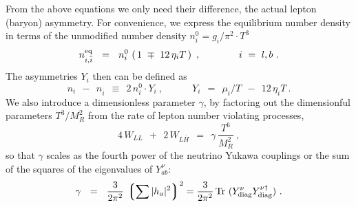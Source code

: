 \documentclass[12pt]{revtex4}
\newcommand{\eq}{{\rm eq}}
\newcommand{\lgr}{\left\lgroup}
\newcommand{\rgr}{\right\rgroup}
\newcommand{\Mpl}{M_{\rm Pl}}
\newcommand{\ov}{\overline}
\begin{document}
	From the above equations we only need their difference, the actual
	lepton (baryon) asymmetry.
	For convenience, we express the equilibrium number density in terms
	of the unmodified number density 
	$ n_i^0 = g_i/\pi^2 \cdot T^3 $
\[
	n_{i,\ov{i}}^\eq ~~=~~ n_i^0\, \left(\, 1 ~\mp~ 12\,\eta_i T \,\right)~,
	\qquad\qquad{i ~=~ l, b}~.
\]
	The asymmetries $ Y_i $ then can be defined as
\[
	n_i ~~-~~ n_{\ov{i}} ~~\equiv~~ 2\, n_i^0 \cdot Y_i~,
	\qquad\quad Y_i ~~=~~ \mu_i/T ~~-~~ 12\,\eta_i T~.
\]
	We also introduce a dimensionless parameter $ \gamma $, 
	by factoring out the dimensionful parameters $T^3/M_R^2$ from
	the rate of lepton number violating processes,
\begin{equation*}
	4\, W_{LL} ~~+~~ 2\, W_{L\ov{H}} ~~=~~ 
		 \gamma\, \frac{T^6}{M_R^2}~,
\end{equation*}
so that $\gamma$ scales as the fourth power of the neutrino Yukawa couplings or the 
sum of the squares of the eigenvalues of $Y_{ab}^\nu$: 
\begin{equation}
\label{gamma}
	\gamma  ~~=~~ \frac{3}{2\pi^2}\, \lgr \sum |h_a|^2 \rgr^2 = \frac{3}{2\pi^2}\, {\rm Tr}~ (Y^\nu_{\rm diag}
Y^{\nu\dagger}_{\rm diag})~.
\end{equation}
\end{document}
